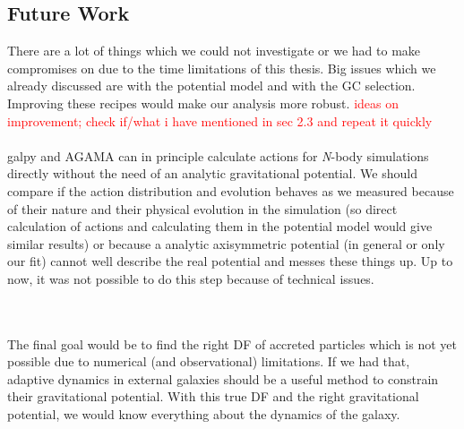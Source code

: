 \subsection{Future Work}
There are a lot of things which we could not investigate or we had to make compromises on due to the time limitations of this thesis. Big issues which we already discussed are with the potential model and with the \ac{GC} selection. Improving these recipes would make our analysis more robust. \textcolor{red}{ideas on improvement; check if/what i have mentioned in sec 2.3 and repeat it quickly}
\\\\
galpy and AGAMA \citep{Vasiliev...AGAMA...2019} can in principle calculate actions for \textit{N}-body simulations directly without the need of an analytic gravitational potential. We should compare if the action distribution and evolution behaves as we measured because of their nature and their physical evolution in the simulation (so direct calculation of actions and calculating them in the potential model would give similar results) or because a analytic axisymmetric potential (in general or only our fit) cannot well describe the real potential and messes these things up. Up to now, it was not possible to do this step because of technical issues. 

\\\\The final goal would be to find the right \ac{DF} of accreted particles which is not yet possible due to numerical (and observational) limitations. If we had that, adaptive dynamics in external galaxies should be a useful method to constrain their gravitational potential. With this true \ac{DF} and the right gravitational potential, we would know everything about the dynamics of the galaxy.

